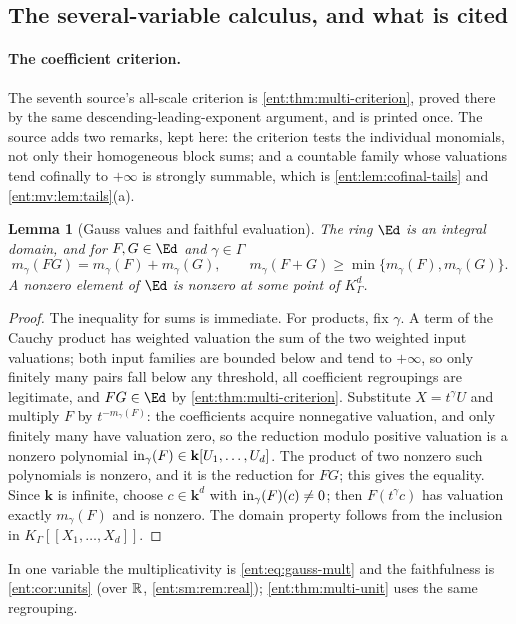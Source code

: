\documentclass[11pt]{article}
\theoremstyle{plain}
\newtheorem{lemma}[lemma]{Lemma}
\theoremstyle{plain}
\theoremstyle{plain}
\theoremstyle{definition}
\theoremstyle{definition}
\theoremstyle{definition}
\theoremstyle{definition}
\theoremstyle{remark}
\newcommand{\K}{K_\Gamma}\newcommand{\KD}{K_\Delta}
\newcommand{\kk}{\mathbf k}\newcommand{\PP}{\mathbb P}
\begin{document}
\subsection{The several-variable calculus, and what is cited}
\label{ent:rc:subsec:calculus}

\paragraph{The coefficient criterion.} The seventh source's all-scale
criterion is \cref{ent:thm:multi-criterion}, proved there by the same
descending-leading-exponent argument, and is printed once. The source adds
two remarks, kept here: the criterion tests the individual monomials, not only
their homogeneous block sums; and a countable family whose valuations tend
cofinally to $+\infty$ is strongly summable, which is
\cref{ent:lem:cofinal-tails} and \cref{ent:mv:lem:tails}(a).

\begin{lemma}[Gauss values and faithful evaluation]\label{ent:rc:lem:gauss}
The ring $\Ed$ is an integral domain, and for $F,G\in\Ed$ and
$\gamma\in\Gamma$
\[
 m_\gamma(FG)=m_\gamma(F)+m_\gamma(G),\qquad
 m_\gamma(F+G)\ge\min\{m_\gamma(F),m_\gamma(G)\}.
\]
A nonzero element of $\Ed$ is nonzero at some point of $\K^d$.
\end{lemma}
\begin{proof}
The inequality for sums is immediate. For products, fix $\gamma$. A term of
the Cauchy product has weighted valuation the sum of the two weighted input
valuations; both input families are bounded below and tend to $+\infty$, so
only finitely many pairs fall below any threshold, all coefficient
regroupings are legitimate, and $FG\in\Ed$ by
\cref{ent:thm:multi-criterion}. Substitute $X=t^\gamma U$ and multiply $F$ by
$t^{-m_\gamma(F)}$: the coefficients acquire nonnegative valuation, and only
finitely many have valuation zero, so the reduction modulo positive valuation
is a nonzero polynomial $\inpol_\gamma(F)\in\kk[U_1,\ldots,U_d]$. The product
of two nonzero such polynomials is nonzero, and it is the reduction for $FG$;
this gives the equality. Since $\kk$ is infinite, choose $c\in\kk^d$ with
$\operatorname{in}_\gamma(F)(c)\ne0$; then $F(t^\gamma c)$ has valuation exactly
$m_\gamma(F)$ and is nonzero. The domain property follows from the inclusion
in $\K[[X_1,\ldots,X_d]]$.
\end{proof}

In one variable the multiplicativity is \eqref{ent:eq:gauss-mult} and the
faithfulness is \cref{ent:cor:units} (over $\mathbb R$,
\cref{ent:sm:rem:real}); \cref{ent:thm:multi-unit} uses the same regrouping.
\end{document}
